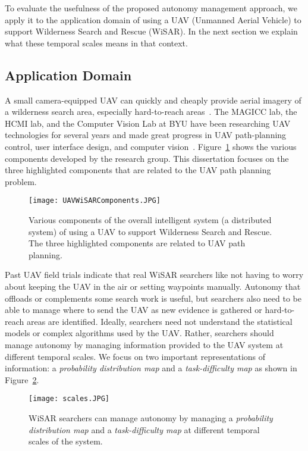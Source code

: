 To evaluate the usefulness of the proposed autonomy management approach, we apply it to the application domain of using a UAV (Unmanned Aerial Vehicle) to support Wilderness Search and Rescue (WiSAR). In the next section we explain what these temporal scales means in that context. 

\subsection{Application Domain}

A small camera-equipped UAV can quickly and cheaply provide aerial imagery of a wilderness search area, especially hard-to-reach areas~\cite{Goodrich2008Supporting}. The MAGICC lab, the HCMI lab, and the Computer Vision Lab at BYU have been researching UAV technologies for several years and made great progress in UAV path-planning control, user interface design, and computer vision~\cite{Lin2010Supporting}. Figure~\ref{SystemComponents} shows the various components developed by the research group. This dissertation focuses on the three highlighted components that are related to the UAV path planning problem.

\begin{figure}
\centering
\texttt{[image: UAVWiSARComponents.JPG]}
\caption[Components of the overall UAV integrated intelligent system]{Various components of the overall intelligent system (a distributed system) of using a UAV to support Wilderness Search and Rescue. The three highlighted components are related to UAV path planning.}
\label{SystemComponents}
\end{figure}

Past UAV field trials indicate that real WiSAR searchers like not having to worry about keeping the UAV in the air or setting waypoints manually. Autonomy that offloads or complements some search work is useful, but searchers also need to be able to manage where to send the UAV as new evidence is gathered or hard-to-reach areas are identified. Ideally, searchers need not understand the statistical models or complex algorithms used by the UAV. Rather, searchers should manage autonomy by managing information provided to the UAV system at different temporal scales. We focus on two important representations of information: a \textit{probability distribution map} and a \textit{task-difficulty map} as shown in Figure~\ref{Scales}.

\begin{figure}
\centering
\texttt{[image: scales.JPG]}
\caption[Managing information at three scales]{WiSAR searchers can manage autonomy by managing a \textit{probability distribution map} and a \textit{task-difficulty map} at different temporal scales of the system.}
\label{Scales}
\end{figure}

